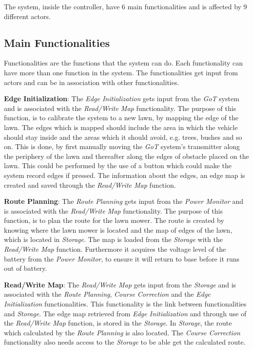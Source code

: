 \noindent
\newpage

The system, inside the controller, have 6 main functionalities and is affected by 9 different actors.

\subsection{Main Functionalities}

Functionalities are the functions that the system can do. Each functionality can have more than one function in the system. The functionalities get input from actors and can be in association with other functionalities. 

\textbf{Edge Initialization}:
The \textit{Edge Initialization} gets input from the \textit{GoT} system and is associated with the \textit{Read/Write Map} functionality. The purpose of this function, is to calibrate the system to a new lawn, by mapping the edge of the lawn. The edges which is mapped should include the area in which the vehicle should stay inside and the areas which it should avoid, e.g. trees, bushes and so on. This is done, by first manually moving the \textit{GoT} system's transmitter along the periphery of the lawn and thereafter along the edges of obstacle placed on the lawn. This could be performed by the use of a button which could make the system record edges if pressed. The information about the edges, an edge map is created and saved through the \textit{Read/Write Map} function.

\textbf{Route Planning}:
The \textit{Route Planning} gets input from the \textit{Power Monitor} and is associated with the \textit{Read/Write Map} functionality. The purpose of this function, is to plan the route for the lawn mower. The route is created by knowing where the lawn mower is located and the map of edges of the lawn, which is located in \textit{Storage}. The map is loaded from the \textit{Storage} with the \textit{Read/Write Map} function. Furthermore it acquires the voltage level of the battery from the \textit{Power Monitor}, to ensure it will return to base before it runs out of battery.

\textbf{Read/Write Map}:
The \textit{Read/Write Map} gets input from the \textit{Storage} and is associated with the \textit{Route Planning}, \textit{Course Correction} and the \textit{Edge Initialization} functionalities. This functionality is the link between functionalities and \textit{Storage}. The edge map retrieved from \textit{Edge Initialization} and through use of the \textit{Read/Write Map} function, is stored in the \textit{Storage}. In \textit{Storage}, the route which calculated by the \textit{Route Planning} is also located. The \textit{Course Correction} functionality also needs access to the \textit{Storage} to be able get the calculated route.

